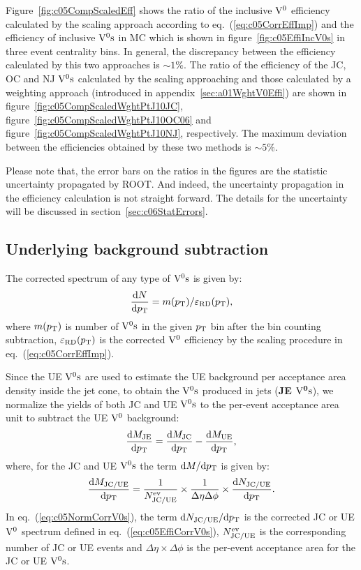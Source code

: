 Figure~\ref{fig:c05CompScaledEff} shows the ratio of the inclusive ${\rm V}^{0}$
efficiency calculated by the scaling approach according
to eq.~(\ref{eq:c05CorrEffImp}) and the efficiency of
inclusive ${\rm V}^{0}{\rm s}$ in MC which is shown in figure~\ref{fig:c05EffiIncV0s}
in three event centrality bins.
In general, the discrepancy between the efficiency calculated by this
two approaches is $\sim 1\%$.
The ratio of the efficiency of the JC, OC and NJ ${\rm V}^{0}{\rm s}$ calculated by the
scaling approaching and those calculated by a weighting approach (introduced
in appendix~\ref{sec:a01WghtV0Effi}) are shown in
figure~\ref{fig:c05CompScaledWghtPtJ10JC},
figure~\ref{fig:c05CompScaledWghtPtJ10OC06} and
figure~\ref{fig:c05CompScaledWghtPtJ10NJ}, respectively.
The maximum deviation between the efficiencies obtained by these two methods
is $\sim 5\%$.

Please note that,
the error bars on the ratios in the figures are the statistic uncertainty
propagated by ROOT.
And indeed, the uncertainty propagation in the efficiency calculation is not
straight forward.
The details for the uncertainty will be discussed
in section~\ref{sec:c06StatErrors}.

\subsection{Underlying background subtraction}\label{sec:c05NormV0s}

The corrected spectrum of any type of ${\rm V}^{0}{\rm s}$
is given by:
\begin{equation}\label{eq:c05EffiCorrV0s}
\frac{{\rm d}N}{{\rm d}p_{\rm T}}=m(p_{\rm T})/\varepsilon_{\rm RD}(p_{\rm T}),
\end{equation}
where $m(p_{\rm T})$ is number of ${\rm V}^{0}{\rm s}$ in the given $p_{\rm T}$ bin after the
bin counting subtraction,
$\varepsilon_{\rm RD}(p_{\rm T})$ is the corrected ${\rm V}^{0}$ efficiency by the
scaling procedure in eq.~(\ref{eq:c05CorrEffImp}).

Since the UE ${\rm V}^{0}{\rm s}$ are used to estimate the UE background per acceptance
area density inside the jet cone,
to obtain the ${\rm V}^{0}{\rm s}$ produced in jets ({\bf JE $\mathbf{{\rm V}^{0}{\rm s}}$}),
we normalize the yields of both JC and UE ${\rm V}^{0}{\rm s}$ to the
per-event acceptance area unit to subtract the UE ${\rm V}^{0}$ background:
\begin{equation}\label{eq:c05NormV0sJE}
\frac{{\rm d}M_{\rm JE}}{{\rm d}p_{\rm T}}=
\frac{{\rm d}M_{\rm JC}}{{\rm d}p_{\rm T}}-\frac{{\rm d}M_{\rm UE}}{{\rm d}p_{\rm T}},
\end{equation}
where, for the JC and UE ${\rm V}^{0}{\rm s}$ the term ${\rm d}M/{\rm d}p_{\rm T}$ is given by:
\begin{equation}\label{eq:c05NormCorrV0s}
\frac{{\rm d}M_{\rm JC/UE}}{{\rm d}p_{\rm T}}=
\frac{1}{N_{\rm JC/UE}^{\rm ev}}\times\frac{1}{\Delta\eta\Delta\phi}\times
\frac{{\rm d}N_{\rm JC/UE}}{{\rm d}p_{\rm T}}.
\end{equation}
In eq.~(\ref{eq:c05NormCorrV0s}),
the term ${\rm d}N_{\rm JC/UE}/{\rm d}p_{\rm T}$ is the corrected JC or
UE ${\rm V}^{0}$ spectrum defined in eq.~(\ref{eq:c05EffiCorrV0s}),
$N_{\rm JC/UE}^{\rm ev}$ is the corresponding number of JC or UE events and
$\Delta\eta\times\Delta\phi$ is the per-event acceptance area for
the JC or UE ${\rm V}^{0}{\rm s}$.

